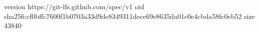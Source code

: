 version https://git-lfs.github.com/spec/v1
oid sha256:cf0bffc7600f1b0703a33d9de8349311dece69e8635da01c0e4cbda58fc0eb52
size 43840
